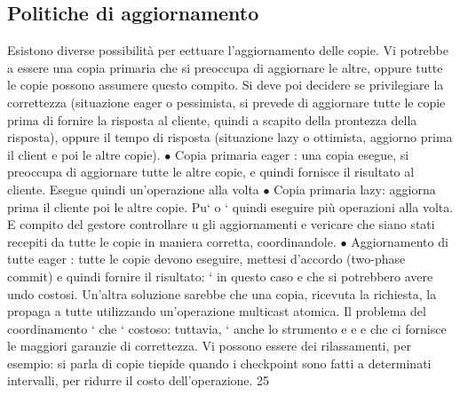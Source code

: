 \documentclass[a4paper,12pt]{article}
\begin{document}
\subsection{Politiche di aggiornamento}
Esistono diverse possibilità per eettuare l'aggiornamento delle copie. Vi potrebbe
a
essere una copia primaria che si preoccupa di aggiornare le altre, oppure tutte
le copie possono assumere questo compito. Si deve poi decidere se privilegiare
la correttezza (situazione eager o pessimista, si prevede di aggiornare tutte le
copie prima di fornire la risposta al cliente, quindi a scapito della prontezza della risposta), oppure il tempo di
risposta (situazione lazy o ottimista, aggiorno
prima il client e poi le altre copie).
$\bullet$ Copia primaria eager : una copia esegue, si preoccupa di aggiornare tutte
le altre copie, e quindi fornisce il risultato al cliente. Esegue quindi
un'operazione alla volta
$\bullet$ Copia primaria lazy: aggiorna prima il cliente poi le altre copie. Pu`
o
`
quindi eseguire più operazioni alla volta. E compito del gestore controllare
u
gli aggiornamenti e vericare che siano stati recepiti da tutte le copie in
maniera corretta, coordinandole.
$\bullet$ Aggiornamento di tutte eager : tutte le copie devono eseguire, mettesi d'accordo (two-phase commit) e quindi
fornire il risultato: ` in questo caso
e
che si potrebbero avere undo costosi. Un'altra soluzione sarebbe che una
copia, ricevuta la richiesta, la propaga a tutte utilizzando un'operazione
multicast atomica.
Il problema del coordinamento ` che ` costoso: tuttavia, ` anche lo strumento
e
e
e
che ci fornisce le maggiori garanzie di correttezza. Vi possono essere dei rilassamenti, per esempio: si parla di copie
tiepide quando i checkpoint sono fatti a
determinati intervalli, per ridurre il costo dell'operazione.
25
\end{document}
